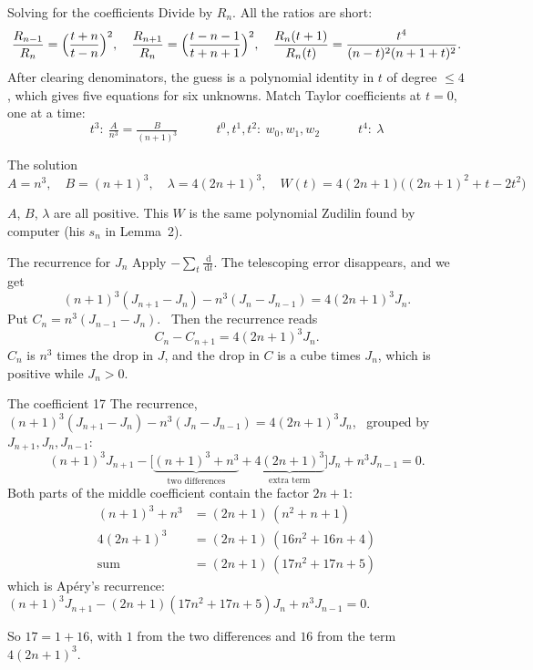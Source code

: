 \documentclass[aspectratio=169,11pt]{beamer}
\newcommand{\dd}{\,\mathrm{d}}
\begin{document}
\begin{frame}{Solving for the coefficients}
  Divide by $R_n$. All the ratios are short:
  {\small
  \[
    \frac{R_{n-1}}{R_n}=\Bigl(\frac{t+n}{t-n}\Bigr)^2,\quad
    \frac{R_{n+1}}{R_n}=\Bigl(\frac{t-n-1}{t+n+1}\Bigr)^2,\quad
    \frac{R_n(t+1)}{R_n(t)}=\frac{t^4}{(n-t)^2(n+1+t)^2}.
  \]}%
  After clearing denominators, the guess is a polynomial identity in $t$ of degree $\le4$,
  which gives five equations for six unknowns. Match Taylor coefficients at $t=0$, one at a time:
  \[
    t^3:\ \tfrac A{n^3}=\tfrac B{(n+1)^3}
    \qquad\quad t^0,t^1,t^2:\ w_0,w_1,w_2
    \qquad\quad t^4:\ \lambda
  \]
  \pause
  \begin{block}{The solution}
    \centering
    $A=n^3,\quad B=(n+1)^3,\quad\lambda=4(2n+1)^3,\quad
    W(t)=4(2n+1)\bigl((2n+1)^2+t-2t^2\bigr)$
    \\[3pt]
    \raggedright
    $A$, $B$, $\lambda$ are all positive.
    This $W$ is the same polynomial Zudilin found by computer (his $s_n$ in Lemma~2).
  \end{block}
\end{frame}

\begin{frame}{The recurrence for $J_n$}
  Apply $-\sum_t\frac{\dd}{\dd t}$. The telescoping error disappears, and we get
  \[
    (n+1)^3(J_{n+1}-J_n)-n^3(J_n-J_{n-1})=4(2n+1)^3J_n .
  \]
  \pause
  Put $C_n=n^3(J_{n-1}-J_n)$. \ Then the recurrence reads
  \[
    C_n-C_{n+1}=4(2n+1)^3J_n .
  \]
  $C_n$ is $n^3$ times the drop in $J$, and the drop in $C$ is a cube times $J_n$, which is
  positive while $J_n>0$.
\end{frame}

\begin{frame}{The coefficient 17}
  The recurrence, \ $(n+1)^3(J_{n+1}-J_n)-n^3(J_n-J_{n-1})=4(2n+1)^3J_n$, \ grouped by $J_{n+1},J_n,J_{n-1}$:
  \[
    (n+1)^3J_{n+1}-\bigl[\underbrace{(n+1)^3+n^3}_{\text{two differences}}+\underbrace{4(2n+1)^3}_{\text{extra term}}\bigr]J_n+n^3J_{n-1}=0 .
  \]
  Both parts of the middle coefficient contain the factor $2n+1$:
  \[
    \begin{aligned}
      (n+1)^3+n^3&=(2n+1)\,(n^2+n+1)\\
      4(2n+1)^3&=(2n+1)\,(16n^2+16n+4)\\
      \text{sum}&=(2n+1)\,(17n^2+17n+5)
    \end{aligned}
  \]
  which is Ap\'ery's recurrence:
  \ $(n+1)^3J_{n+1}-(2n+1)(17n^2+17n+5)J_n+n^3J_{n-1}=0$.
  \medskip

  So $17=1+16$, with $1$ from the two differences and $16$ from the term $4(2n+1)^3$.
\end{frame}
\end{document}
